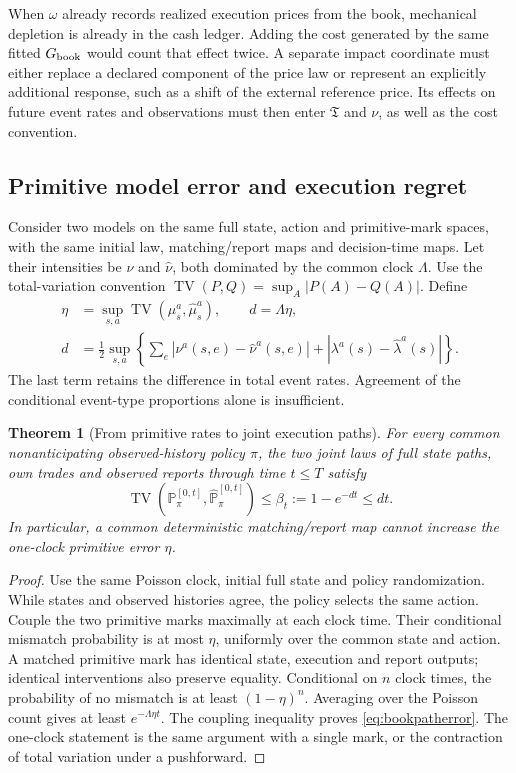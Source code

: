 \documentclass[11pt]{article}
\numberwithin{equation}{section}
\newtheorem{theorem}{Theorem}[section]
\theoremstyle{definition}
\theoremstyle{remark}
\theoremstyle{definition}
\newcommand{\TV}{\operatorname{TV}}
\begin{document}
When $\omega$ already records realized execution prices from the book,
mechanical depletion is already in the cash ledger. Adding the cost generated
by the same fitted $G_{\rm book}$ would count that effect twice. A separate
impact coordinate must either replace a declared component of the price law
or represent an explicitly additional response, such as a shift of the
external reference price. Its effects on future event rates and observations
must then enter $\mathfrak T$ and $\nu$, as well as the cost convention.

\subsection{Primitive model error and execution regret}
\label{sec:primitivemodelerror}

Consider two models on the same full state, action and primitive-mark spaces,
with the same initial law, matching/report maps and decision-time maps. Let
their intensities be $\nu$ and $\widehat\nu$, both dominated by the common
clock $\Lambda$. Use the total-variation convention
$\TV(P,Q)=\sup_A|P(A)-Q(A)|$. Define
\begin{align}\label{eq:primitiveerror}
 \eta&=\sup_{s,a}\TV(\mu_s^a,\widehat\mu_s^a),\qquad d=\Lambda\eta,\\
 d&=\frac12\sup_{s,a}\left\{
       \sum_e|\nu^a(s,e)-\widehat\nu^a(s,e)|
       +|\lambda^a(s)-\widehat\lambda^a(s)|\right\}.\nonumber
\end{align}
The last term retains the difference in total event rates. Agreement of the
conditional event-type proportions alone is insufficient.

\begin{theorem}[From primitive rates to joint execution paths]\label{thm:bookcoupling}
For every common nonanticipating observed-history policy $\pi$, the two
joint laws of full state paths, own trades and observed reports through time
$t\le T$ satisfy
\begin{equation}\label{eq:bookpatherror}
 \TV(\mathbb P_\pi^{[0,t]},\widehat{\mathbb P}_\pi^{[0,t]})
       \le\beta_t:=1-e^{-dt}\le dt.
\end{equation}
In particular, a common deterministic matching/report map cannot increase
the one-clock primitive error $\eta$.
\end{theorem}
\begin{proof}
Use the same Poisson clock, initial full state and policy randomization.
While states and observed histories agree, the policy selects the same
action. Couple the two primitive marks maximally at each clock time. Their
conditional mismatch probability is at most $\eta$, uniformly over the
common state and action. A matched primitive mark has identical state,
execution and report outputs; identical interventions also preserve equality.
Conditional on $n$ clock times, the probability of no mismatch is at least
$(1-\eta)^n$. Averaging over the Poisson count gives at least
$e^{-\Lambda\eta t}$. The coupling inequality proves
\eqref{eq:bookpatherror}. The one-clock statement is the same argument with
a single mark, or the contraction of total variation under a pushforward.
\end{proof}
\end{document}
